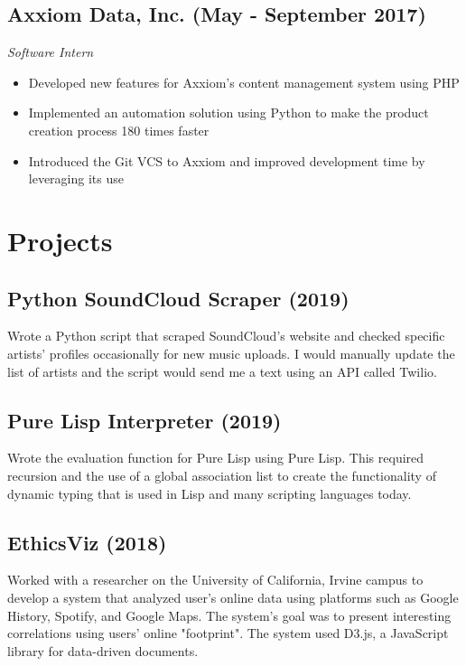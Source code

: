 \documentclass{article}
\begin{document}
\subsection{Axxiom Data, Inc. (May - September 2017)}

\noindent\textit{Software Intern}
\begin{itemize}
	\setlength\itemsep{0em}
	\item Developed new features for Axxiom's content management system using PHP
	\item Implemented an automation solution using Python to make the product creation process 180 times faster
	\item Introduced the Git VCS to Axxiom and improved development time by leveraging its use
\end{itemize}

\section{Projects}

\subsection{Python SoundCloud Scraper (2019)}

Wrote a Python script that scraped SoundCloud's website and checked specific artists' profiles occasionally for new music uploads. 
I would manually update the list of artists and the script would send me a text using an API called Twilio.

\subsection{Pure Lisp Interpreter (2019)}

Wrote the evaluation function for Pure Lisp using Pure Lisp. This required recursion and the use of a global 
association list to create the functionality of dynamic typing that is used in Lisp and many scripting languages today.

\subsection{EthicsViz (2018)}

Worked with a researcher on the University of California, Irvine campus to develop a system that analyzed 
user's online data using platforms such as Google History, Spotify, and Google Maps. The system's goal was to present interesting correlations using users' online "footprint".  The system used D3.js, a JavaScript library for data-driven documents. 
\end{document}
